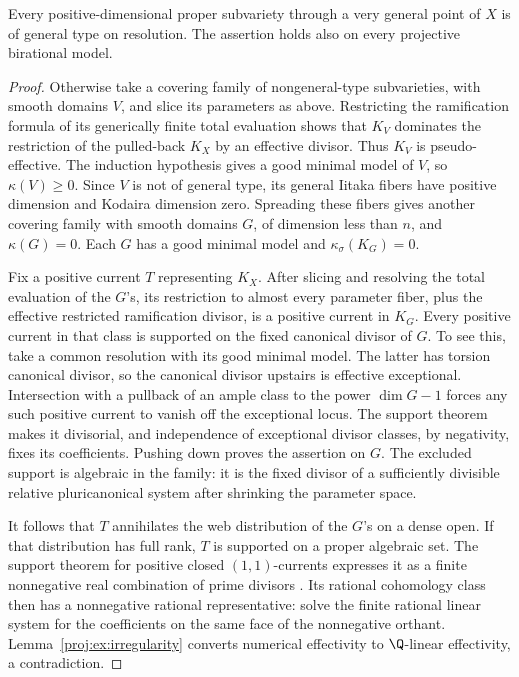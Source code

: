 \begin{proposition}\label{proj:prop:general-type}
Every positive-dimensional proper subvariety through a very general
point of \(X\) is of general type on resolution. The assertion holds
also on every projective birational model.
\end{proposition}
\begin{proof}
Otherwise take a covering family of nongeneral-type subvarieties,
with smooth domains \(V\), and slice its parameters as above.
Restricting the ramification formula of its generically finite
total evaluation shows that \(K_V\) dominates the restriction of
the pulled-back \(K_X\) by an effective divisor. Thus \(K_V\) is
pseudo-effective. The induction hypothesis gives a good minimal
model of \(V\), so \(\kappa(V)\geq0\). Since \(V\) is not of general
type, its general Iitaka fibers have positive dimension and
Kodaira dimension zero. Spreading these fibers gives another
covering family with smooth domains \(G\), of dimension less than
\(n\), and \(\kappa(G)=0\). Each \(G\) has a good minimal model and
\(\kappa_\sigma(K_G)=0\).

Fix a positive current \(T\) representing \(K_X\). After slicing and
resolving the total evaluation of the \(G\)'s, its restriction to
almost every parameter fiber, plus the effective restricted
ramification divisor, is a positive current in \(K_G\).
Every positive current in that class is supported on the fixed
canonical divisor of \(G\). To see this, take a common resolution
with its good minimal model. The latter has torsion canonical
divisor, so the canonical divisor upstairs is effective exceptional.
Intersection with a pullback of an ample class to the power
\(\dim G-1\) forces any such positive current to vanish off the
exceptional locus. The support theorem makes it divisorial, and
independence of exceptional divisor classes, by negativity, fixes
its coefficients. Pushing down proves the assertion on \(G\).
The excluded support is algebraic in the family: it is the fixed
divisor of a sufficiently divisible relative pluricanonical
system after shrinking the parameter space.

It follows that \(T\) annihilates the web distribution of the
\(G\)'s on a dense open. If that distribution has full rank, \(T\)
is supported on a proper algebraic set. The support theorem for
positive closed \((1,1)\)-currents expresses it as a finite
nonnegative real combination of prime divisors
\cite{Proj-Siu1974,Proj-Demailly2012}. Its rational cohomology class then has
a nonnegative rational representative: solve the finite rational
linear system for the coefficients on the same face of the
nonnegative orthant. Lemma~\ref{proj:ex:irregularity} converts numerical
effectivity to \(\Q\)-linear effectivity, a contradiction.


\end{proof}

